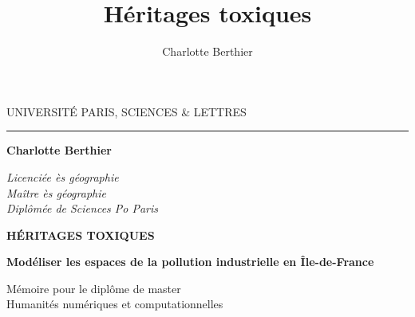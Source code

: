 \documentclass[a4paper,twoside,12pt]{book}
\title{Héritages toxiques}
\author{Charlotte Berthier}
\begin{document}

\frontmatter

\begin{titlepage}
\begin{center}

\bigskip

\begin{large}
UNIVERSITÉ PARIS, SCIENCES \& LETTRES
\end{large}

\begin{center}\rule{2cm}{0.02cm}\end{center}

\bigskip
\bigskip
\bigskip
\begin{Large}
\textbf{Charlotte Berthier}\\
\end{Large}
\begin{normalsize} \textit{Licenciée ès géographie}\\
\textit{Maître ès géographie}\\
\textit{Diplômée de Sciences Po Paris}\\
\end{normalsize}

\bigskip
\bigskip
\bigskip

\begin{Huge}
\textbf{HÉRITAGES TOXIQUES}\\
\end{Huge}
\bigskip
\bigskip
\begin{LARGE}
\textbf{Modéliser les espaces de la pollution industrielle en Île-de-France}\\
\end{LARGE}

\bigskip
\bigskip
\bigskip
\begin{large}
\end{large}
\vfill

\begin{large}
Mémoire 
pour le diplôme de master\\
\og Humanités numériques et computationnelles \fg{} \\
\end{large}

\end{center}
\end{titlepage}

\thispagestyle{empty}

\cleardoublepage
\end{document}
